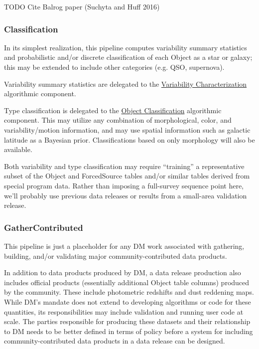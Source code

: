 \begin{note}{TODO}
Cite Balrog paper (Suchyta and  Huff 2016)
\end{note}

\subsubsection{Classification}
\label{sec:drpClassification}

In its simplest realization, this pipeline computes variability summary statistics and probabilistic and/or discrete classification of each Object as a star or galaxy; this may be extended to include other categories (e.g. QSO, supernova).

Variability summary statistics are delegated to the \hyperref[sec:acVariabilityCharacterization]{Variability Characterization} algorithmic component.

Type classification is delegated to the \hyperref[sec:acObjectClassification]{Object Classification} algorithmic component.  This may utilize any combination of morphological, color, and variability/motion information, and may use spatial information such as galactic latitude as a Bayesian prior.  Classifications based on only morphology will also be available.

Both variability and type classification may require ``training'' a representative subset of the Object and ForcedSource tables and/or similar tables derived from special program data.  Rather than imposing a full-survey sequence point here, we'll probably use previous data releases or results from a small-area validation release.

\subsubsection{GatherContributed}
\label{sec:drpGatherContributed}

This pipeline is just a placeholder for any DM work associated with gathering, building, and/or validating major community-contributed data products.

In addition to data products produced by DM, a data release production also includes official products (essentially additional Object table columns) produced by the community.  These include photometric redshifts and dust reddening maps.  While DM's mandate does not extend to developing algorithms or code for these quantities, its responsibilities may include validation and running user code at scale.  The parties responsible for producing these datasets and their relationship to DM needs to be better defined in terms of policy before a system for including community-contributed data products in a data release can be designed.
